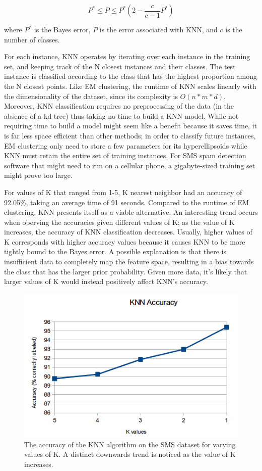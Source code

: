 \documentclass[letterpaper, 10 pt, conference]{ieeeconf}  %
\begin{document}
\[
P^* \leq P \leq P^*(2-\frac{c}{c-1}P^*) 
\]

where $P^*$ is the Bayes error, $P$ is the error associated with KNN,
and $c$ is the number of classes.

For each instance, KNN operates by iterating over each instance in the
training set, and keeping track of the N closest instances and their
classes. The test instance is classified according to the class that
has the highest proportion among the N closest points. Like EM
clustering, the runtime of KNN scales linearly with the dimensionality
of the dataset, since its complexity is $O(n*m*d)$. Moreover, KNN
classification requires no preprocessing of the data (in the absence
of a kd-tree) thus taking no time to build a KNN model. While not
requiring time to build a model might seem like a benefit because it
saves time, it is far less space efficient than other methods; in
order to classify future instances, EM clustering only need to store a
few parameters for its hyperellipsoids while KNN must retain the
entire set of training instances. For SMS spam detection software that
might need to run on a cellular phone, a gigabyte-sized training set
might prove too large.

For values of K that ranged from 1-5, K nearest neighbor had an
accuracy of 92.05\%, taking an average time of 91 seconds. Compared to
the runtime of EM clustering, KNN presents itself as a viable
alternative. An interesting trend occurs when oberving the accuracies
given different values of K; as the value of K increases, the accuracy
of KNN classification decreases. Usually, higher values of K
corresponds with higher accuracy values because it causes KNN to be
more tightly bound to the Bayes error. A possible explanation is that
there is insufficient data to completely map the feature space,
resulting in a bias towards the class that has the larger prior
probability. Given more data, it's likely that larger values of K
would instead positively affect KNN's accuracy.

\begin{figure}[t]
\centering
\includegraphics[width=\columnwidth]{figures/KNN.png}
\caption{
The accuracy of the KNN algorithm on the SMS dataset for varying values of K. A distinct downwards trend is noticed as the value of K increases.
}
\label{fig:fig4}
\end{figure}
\end{document}
